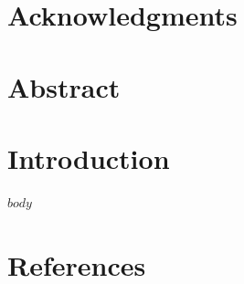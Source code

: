\documentclass[11pt,oneside]{scrbook} %
\begin{document}
\newpage
\setcounter{page}{2}
\pagestyle{plain}
    \chapter*{Acknowledgments}


\newpage
\renewcommand{\contentsname}{Table of Contents}
    \begin{singlespace}
      \tableofcontents
    \end{singlespace}


% 
\newpage
\chapter*{Abstract}


\newpage
\pagestyle{plain}%
\mainmatter

\chapter{Introduction}

$body$
% 

\newpage
{}
\chapter*{References}





\end{document}
